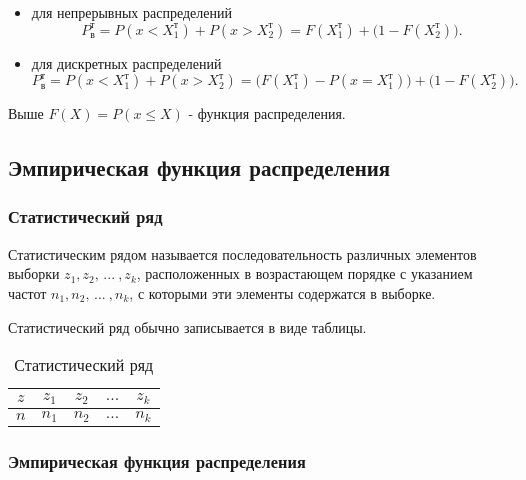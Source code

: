 \begin{itemize}
	\item  для непрерывных распределений
	\begin{equation}
		P_\text{в}^\text{т} = P(x < X_1^\text{т}) + P(x > X_2^\text{т}) = F(X_1^\text{т}) + \Big(1 - F(X_2^\text{т})\Big).
	\end{equation}
	
	\item для дискретных распределений
	\begin{equation}
		P_\text{в}^\text{т} = P(x < X_1^\text{т}) + P(x > X_2^\text{т}) = \Big(F(X_1^\text{т}) - P(x = X_1^\text{т})\Big) + \Big(1 - F(X_2^\text{т})\Big).
	\end{equation}
\end{itemize}
	
Выше $F(X) = P(x \le X)$ - функция распределения.

\subsection{Эмпирическая функция распределения}

\subsubsection{Статистический ряд}

Статистическим рядом называется последовательность различных элементов выборки $z_1, z_2, \, ... \: , z_k$, расположенных в возрастающем порядке с указанием частот $n_1, n_2, \, ... \: , n_k$, с которыми эти элементы содержатся в выборке.

Статистический ряд обычно записывается в виде таблицы.

\begin{table}[h!]
	\begin{center}
		\begin{tabular}{|c|c|c|c|c|}
			\hline
			$z$ & $z_1$ & $z_2$ & $...$ & $z_k$ \\
			\hline
			$n$ & $n_1$ & $n_2$ & $...$ & $n_k$ \\
			\hline
		\end{tabular}
	\end{center}
	\caption{Статистический ряд}
\end{table} 

\subsubsection{Эмпирическая функция распределения}


